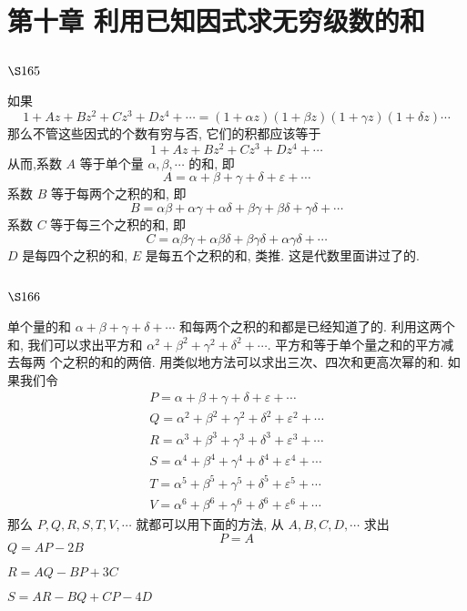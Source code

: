 \chapter{第十章 利用已知因式求无穷级数的和}

\section{$\S 165$}

如果
\[
1+A z+B z^{2}+C z^{3}+D z^{4}+\cdots=(1+\alpha z)(1+\beta z)(1+\gamma z)(1+\delta z) \cdots
\]
那么不管这些因式的个数有穷与否, 它们的积都应该等于
\[
1+A z+B z^{2}+C z^{3}+D z^{4}+\cdots
\]
从而,系数 $A$ 等于单个量 $\alpha, \beta, \cdots$ 的和, 即
\[
A=\alpha+\beta+\gamma+\delta+\varepsilon+\cdots
\]
系数 $B$ 等于每两个之积的和, 即
\[
B=\alpha \beta+\alpha \gamma+\alpha \delta+\beta \gamma+\beta \delta+\gamma \delta+\cdots
\]
系数 $C$ 等于每三个之积的和, 即
\[
C=\alpha \beta \gamma+\alpha \beta \delta+\beta \gamma \delta+\alpha \gamma \delta+\cdots
\]
$D$ 是每四个之积的和, $E$ 是每五个之积的和, 类推. 这是代数里面讲过了的.

\section{$\S 166$}

单个量的和 $\alpha+\beta+\gamma+\delta+\cdots$ 和每两个之积的和都是已经知道了的. 利用这两个 和, 我们可以求出平方和 $\alpha^{2}+\beta^{2}+\gamma^{2}+\delta^{2}+\cdots$. 平方和等于单个量之和的平方减去每两 个之积的和的两倍. 用类似地方法可以求出三次、四次和更高次幂的和. 如果我们令
\[
\begin{gathered}
P=\alpha+\beta+\gamma+\delta+\varepsilon+\cdots \\
Q=\alpha^{2}+\beta^{2}+\gamma^{2}+\delta^{2}+\varepsilon^{2}+\cdots \\
R=\alpha^{3}+\beta^{3}+\gamma^{3}+\delta^{3}+\varepsilon^{3}+\cdots \\
S=\alpha^{4}+\beta^{4}+\gamma^{4}+\delta^{4}+\varepsilon^{4}+\cdots \\
T=\alpha^{5}+\beta^{5}+\gamma^{5}+\delta^{5}+\varepsilon^{5}+\cdots \\
V=\alpha^{6}+\beta^{6}+\gamma^{6}+\delta^{6}+\varepsilon^{6}+\cdots
\end{gathered}
\]
那么 $P, Q, R, S, T, V, \cdots$ 就都可以用下面的方法, 从 $A, B, C, D, \cdots$ 求出
\[
P=A
\]
$Q=A P-2 B$

$R=A Q-B P+3 C$

$S=A R-B Q+C P-4 D$

